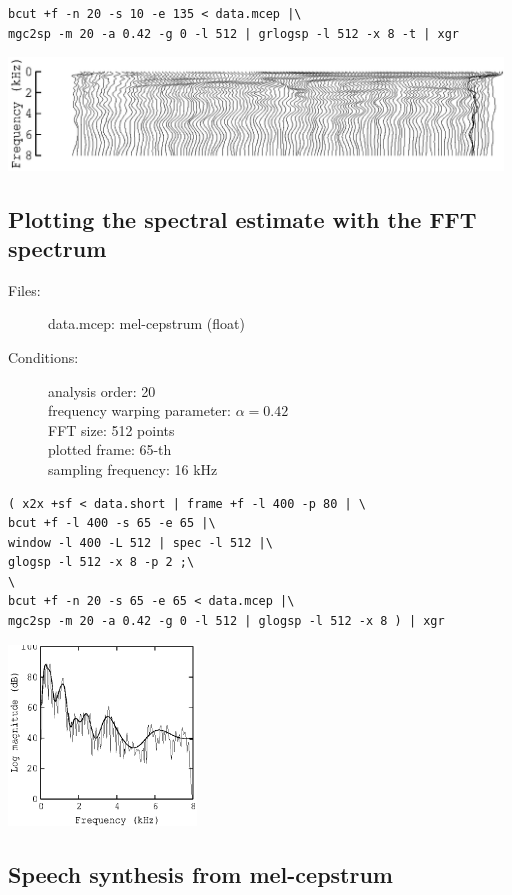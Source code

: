 \documentclass[a4paper,10pt]{article}
\begin{document}
\begin{verbatim}
bcut +f -n 20 -s 10 -e 135 < data.mcep |\
mgc2sp -m 20 -a 0.42 -g 0 -l 512 | grlogsp -l 512 -x 8 -t | xgr
\end{verbatim}

\includegraphics[height=3cm]{eps/data.mcep.grlogsp-t.eps}

\subsection{Plotting the spectral estimate with the FFT spectrum}

\begin{description}
\item[Files:]
  data.mcep: mel-cepstrum (float)
\item[Conditions:]
  analysis order: 20\\
  frequency warping parameter: $\alpha = 0.42$\\
  FFT size: 512 points\\
  plotted frame: 65-th\\
  sampling frequency: 16 kHz
\end{description}

\begin{verbatim}
( x2x +sf < data.short | frame +f -l 400 -p 80 | \
bcut +f -l 400 -s 65 -e 65 |\
window -l 400 -L 512 | spec -l 512 |\
glogsp -l 512 -x 8 -p 2 ;\
\
bcut +f -n 20 -s 65 -e 65 < data.mcep |\
mgc2sp -m 20 -a 0.42 -g 0 -l 512 | glogsp -l 512 -x 8 ) | xgr
\end{verbatim}

\includegraphics[width=5cm]{eps/data.mcep.glogsp.eps}

\subsection{Speech synthesis from mel-cepstrum}
\end{document}
